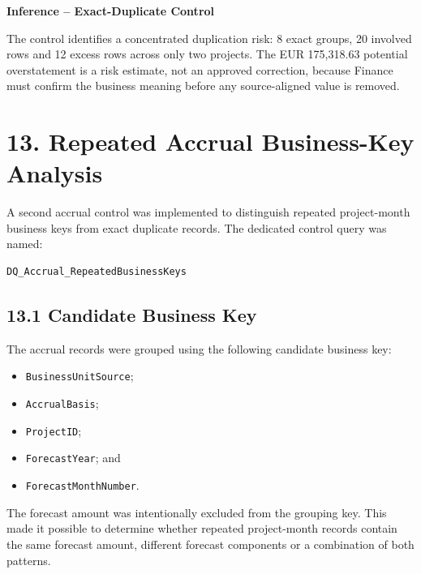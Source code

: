 \documentclass[11pt,a4paper]{article}
\begin{document}
\begin{inferencebox}

\textbf{Inference -- Exact-Duplicate Control}

The control identifies a concentrated duplication risk: 8 exact groups,
20 involved rows and 12 excess rows across only two projects. The EUR
175,318.63 potential overstatement is a risk estimate, not an approved
correction, because Finance must confirm the business meaning before any
source-aligned value is removed.

\end{inferencebox}


\section{13. Repeated Accrual Business-Key Analysis}

A second accrual control was implemented to distinguish repeated
project-month business keys from exact duplicate records. The dedicated
control query was named:

\begin{lstlisting}[style=powerquery]
DQ_Accrual_RepeatedBusinessKeys
\end{lstlisting}

\subsection{13.1 Candidate Business Key}

The accrual records were grouped using the following candidate business
key:

\begin{itemize}[leftmargin=7mm,itemsep=2pt]
    \item \texttt{BusinessUnitSource};
    \item \texttt{AccrualBasis};
    \item \texttt{ProjectID};
    \item \texttt{ForecastYear}; and
    \item \texttt{ForecastMonthNumber}.
\end{itemize}

The forecast amount was intentionally excluded from the grouping key.
This made it possible to determine whether repeated project-month records
contain the same forecast amount, different forecast components or a
combination of both patterns.
\end{document}
